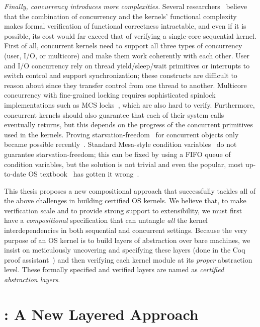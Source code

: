 {\em Finally, concurrency introduces more complexities.}
Several
researchers~\cite{vontessin13,peters15} believe that the combination
of concurrency and the kernels' functional complexity makes formal
verification of functional correctness intractable, and even if it is
possible, its cost would far exceed that of verifying a single-core
sequential kernel.
First of all, concurrent kernels need to support all three types of
concurrency (user, I/O, or multicore) and make them work coherently
with each other. User and I/O concurrency rely on thread
yield/sleep/wait primitives or interrupts to switch control and
support synchronization; these constructs are difficult to reason
about since they transfer control from one thread to another.
Multicore concurrency with fine-grained locking requires sophisticated
spinlock implementations such as MCS locks~\cite{mcs91}, which
 are also
hard to verify.
Furthermore, concurrent kernels should also guarantee that each of their
system calls eventually returns, but this depends on the progress of
the concurrent primitives used in the kernels. Proving
starvation-freedom~\cite{Herlihy08book} for concurrent objects only
became possible recently~\cite{lili16}.  Standard Mesa-style condition
variables~\cite{lampson80} do not guarantee starvation-freedom; this
can be fixed by using a FIFO queue of condition variables, but the
solution is not trivial and even the popular, most up-to-date OS
textbook~\cite[Figure~5.14]{ospp11} has gotten it
wrong~\cite{anderson16}.

This thesis proposes a new compositional approach that
successfully tackles all of the above challenges in building certified
OS kernels. We believe that, to make verification scale and to provide
strong support to extensibility, we must first have a {\em
  compositional} specification that can untangle {\em all} the kernel
interdependencies in both sequential and concurrent settings. Because the very purpose of an OS kernel is to
build layers of abstraction over bare machines, we insist on
meticulously uncovering and specifying these layers (done in the Coq
proof assistant~\cite{coq}) and then verifying each kernel module at
its {\em proper} abstraction level.
These formally specified and verified layers
are named as {\em certified abstraction layers}.

\section{\CTOS{}: A New Layered Approach}
\label{sec:intro:layer}

